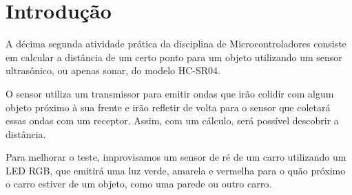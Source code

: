 \section{Introdução}

A décima segunda atividade prática da disciplina de Microcontroladores consiste em calcular a distância de um certo ponto para um objeto utilizando um sensor ultrasônico, ou apenas sonar, do modelo HC-SR04.

O sensor utiliza um transmissor para emitir ondas que irão colidir com algum objeto próximo à sua frente e irão refletir de volta para o sensor que coletará essas ondas com um receptor. Assim, com um cálculo, será possível descobrir a distância.

Para melhorar o teste, improvisamos um sensor de ré de um carro utilizando um LED RGB, que emitirá uma luz verde, amarela e vermelha para o quão próximo o carro estiver de um objeto, como uma parede ou outro carro.

